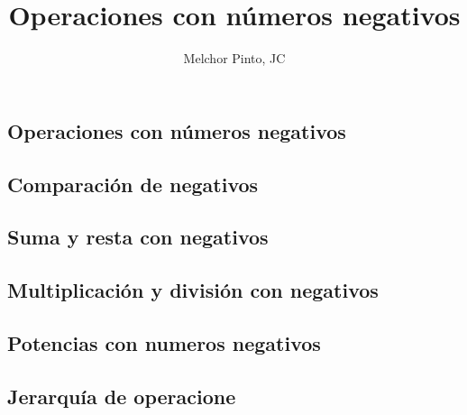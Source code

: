 \documentclass{guia}
\title{Operaciones con números negativos}
\author{Melchor Pinto, JC}
\begin{document}
\INFO%
\begin{questions}
\section{Operaciones con números negativos}
\subsection{Comparación de negativos}
\questionboxed{}
\subsection{Suma y resta con negativos}
\questionboxed{}
\subsection{Multiplicación y división con negativos}
\questionboxed{}
\subsection{Potencias con numeros negativos}
\questionboxed{}
\subsection{Jerarquía de operacione}
\questionboxed{}

\end{questions}
\end{document}
